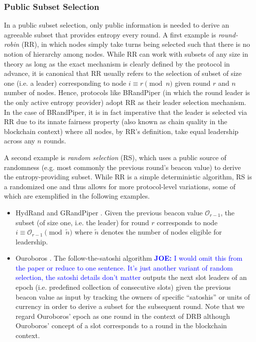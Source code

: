 \documentclass[letterpaper,twocolumn,10pt]{article}
\theoremstyle{definition}
\theoremstyle{remark}
\newcommand{\joenote}[1]{\textcolor{blue}{\textbf{JOE:} #1}}
\begin{document}
\subsubsection{Public Subset Selection}
\label{subsubsection:public-subset-selection}
In a public subset selection, only public information is needed to derive an agreeable subset that provides entropy every round. A first example is \textit{round-robin} (RR), in which nodes simply take turns being selected such that there is no notion of hierarchy among nodes. While RR can work with subsets of any size in theory as long as the exact mechanism is clearly defined by the protocol in advance, it is canonical that RR usually refers to the selection of subset of size one (i.e. a leader) corresponding to node $i \equiv r \pmod n$ given round $r$ and $n$ number of nodes. Hence, protocols like BRandPiper \cite{bhat2020randpiper} (in which the round leader is the only active entropy provider) adopt RR as their leader selection mechanism. In the case of BRandPiper, it is in fact imperative that the leader is selected via RR due to its innate fairness property \cite{azouvi2018winning} (also known as chain quality \cite{garay2015bitcoin} in the blockchain context) where all nodes, by RR's definition, take equal leadership across any $n$ rounds.

A second example is \textit{random selection} (RS), which uses a public source of randomness (e.g. most commonly the previous round's beacon value) to derive the entropy-providing subset. While RR is a simple deterministic algorithm, RS is a randomized one and thus allows for more protocol-level variations, some of which are exemplified in the following examples.
\begin{itemize}
\item HydRand \cite{schindler2020hydrand} and GRandPiper \cite{bhat2020randpiper}. Given the previous beacon value $\mathcal{O}_{r - 1}$, the subset (of size one, i.e. the leader) for round $r$ corresponds to node $i \equiv \mathcal{O}_{r - 1} \pmod{\tilde{n}}$ where $\tilde{n}$ denotes the number of nodes eligible for leadership.
\item Ouroboros \cite{kiayias2017ouroboros}. The follow-the-satoshi algorithm \cite{bentov2014proof,kiayias2017ouroboros}\joenote{I would omit this from the paper or reduce to one sentence. It's just another variant of random selection, the satoshi details don't matter} outputs the next slot leaders of an epoch (i.e. predefined collection of consecutive slots) given the previous beacon value as input by tracking the owners of specific ``satoshis'' or units of currency in order to derive a subset for the subsequent round. Note that we regard Ouroboros' epoch as one round in the context of DRB although Ouroboros' concept of a slot corresponds to a round in the blockchain context.
\end{itemize}
\end{document}
